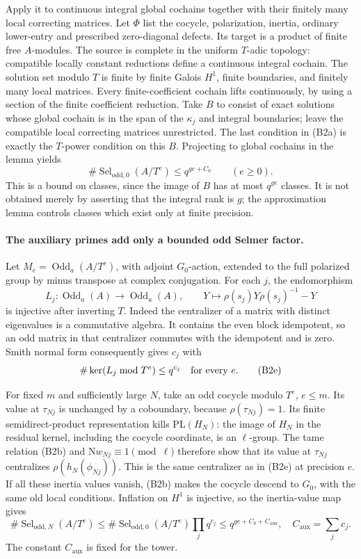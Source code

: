 Apply it to continuous integral global cochains together with their
finitely many local correcting matrices.
Let \(\Phi\) list the cocycle, polarization, inertia, ordinary
lower-entry and prescribed zero-diagonal defects.
Its target is a product of finite free \(A\)-modules.
The source is complete in the uniform \(T\)-adic topology:
compatible locally constant reductions define a continuous integral
cochain.  The solution set modulo \(T\) is finite by finite Galois
\(H^1\), finite boundaries, and finitely many local matrices.
Every finite-coefficient cochain lifts continuously, by using a
section of the finite coefficient reduction.
Take \(B\) to consist of exact solutions whose global cochain is
in the span of the \(\kappa_j\) and integral boundaries; leave the
compatible local correcting matrices unrestricted.
The last condition in (B2a) is exactly the \(T\)-power condition
on this \(B\).  Projecting to global cochains in the lemma yields
\[
 \#\operatorname{Sel}_{\mathrm{odd},0}(A/T^e)
                  \leq q^{ge+C_0}\qquad(e\geq0).
 \tag{B2d}
\]
This is a bound on classes, since the image of \(B\) has at most
\(q^{ge}\) classes.  It is not obtained merely by asserting that
the integral rank is \(g\); the approximation lemma controls
classes which exist only at finite precision.

\paragraph{The auxiliary primes add only a bounded odd Selmer factor.}
Let \(M_e=\operatorname{Odd}_a(A/T^e)\), with adjoint \(G_0\)-action,
extended to the full polarized group by minus transpose at complex
conjugation.
For each \(j\), the endomorphism
\[
 L_j:\operatorname{Odd}_a(A)\to\operatorname{Odd}_a(A),\qquad
       Y\longmapsto \rho(s_j)Y\rho(s_j)^{-1}-Y
\]
is injective after inverting \(T\).
Indeed the centralizer of a matrix with distinct eigenvalues is a
commutative algebra.  It contains the even block idempotent, so an
odd matrix in that centralizer commutes with the idempotent and is
zero.  Smith normal form consequently gives \(c_j\) with
\[
       \#\ker(L_j\bmod T^e)\leq q^{c_j}\quad\hbox{for every }e.
 \tag{B2e}
\]

For fixed \(m\) and sufficiently large \(N\), take an odd cocycle
modulo \(T^e\), \(e\leq m\).
Its value at \(\tau_{Nj}\) is unchanged by a coboundary, because
\(\rho(\tau_{Nj})=1\).
Its finite semidirect-product representation kills
\(\mathrm{PL}(H_N)\): the image of \(H_N\) in the residual kernel,
including the cocycle coordinate, is an \(\ell\)-group.
The tame relation (B2b) and
\(\mathrm Nw_{Nj}\equiv1\pmod\ell\) therefore show that its value
at \(\tau_{Nj}\) centralizes \(\rho(h_N(\phi_{Nj}))\).
This is the same centralizer as in (B2e) at precision \(e\).
If all these inertia values vanish, (B2b) makes the cocycle descend
to \(G_0\), with the same old local conditions.
Inflation on \(H^1\) is injective, so the inertia-value map gives
\[
 \#\operatorname{Sel}_{\mathrm{odd},N}(A/T^e)
 \leq \#\operatorname{Sel}_{\mathrm{odd},0}(A/T^e)
                                  \prod_jq^{c_j}
 \leq q^{ge+C_0+C_{\mathrm{aux}}},
 \quad C_{\mathrm{aux}}=\sum_jc_j.
 \tag{B2f}
\]
The constant \(C_{\mathrm{aux}}\) is fixed for the tower.

